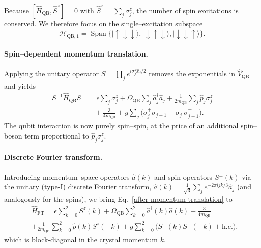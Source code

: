 \documentclass[reprint, aps, prx, amsmath, amssymb, longbibliography, superscriptaddress]{revtex4-2}
\begin{document}
Because $[ \hat H_{\text{QB}}, \hat S^z ] = 0$ with $\hat S^z = \sum_j
\sigma_j^z$, the number of spin excitations is conserved.  We therefore focus
on the single--excitation subspace
\begin{equation}
  \mathcal H_{\text{QB},1} = \operatorname{Span}\bigl\{ |
    \uparrow\downarrow\downarrow\rangle,
    |\downarrow\uparrow\downarrow\rangle,
    |\downarrow\downarrow\uparrow\rangle \bigr\}.
\end{equation}

\paragraph{Spin--dependent momentum translation.}
Applying the unitary operator
$S = \prod_j e^{ i \sigma_j^z \hat x_j / 2 }$ removes the exponentials in
$\hat V_{\text{QB}}$ and yields
\begin{equation}
\label{after-momentum-translation}
  \begin{aligned}
    S^{-1} \hat H_{\text{QB}} S &= \epsilon \sum_{j} \sigma_j^z
      + \Omega_{\text{QB}} \sum_j \hat a_j^{\dagger} \hat a_j
      + \frac{1}{2 m_{\text{QB}}} \sum_j \hat p_j \sigma_j^z
      \\
      &\quad + \frac{3}{4 m_{\text{QB}}}
      + g \sum_{j}
        \bigl( \sigma_j^{+} \sigma_{j+1}^{-} + \sigma_j^{-} \sigma_{j+1}^{+} \bigr).
  \end{aligned}
\end{equation}
The qubit interaction is now purely spin--spin, at the price of an additional
spin--boson term proportional to $\hat p_j \sigma_j^z$.

\paragraph{Discrete Fourier transform.}
Introducing momentum--space operators $\hat a(k)$ and spin operators $S^{\pm}(k)$
via the unitary (type-I) discrete Fourier transform, $\hat a(k)= \tfrac{1}{\sqrt{3}}\sum_{j}e^{-2\pi i jk/3}\hat a_j$ (and analogously for the spins), we
bring Eq.~\eqref{after-momentum-translation} to
\begin{equation}
\label{after-fourier}
  \begin{aligned}
    &\hat H_{\text{FT}} = \epsilon \sum_{k=0}^{2} S^{z}(k)
      + \Omega_{\text{QB}} \sum_{k=0}^{2} \hat a^{\dagger}(k) \hat a(k)
                         + \frac{3}{4 m_{\text{QB}}} \\
     &+\frac{1}{2 m_{\text{QB}}} \sum_{k=0}^{2} \hat p(k) S^{z}(-k)
            + g \sum_{k=0}^{2} \bigl( S^{+}(k) S^{-}(-k) + \text{h.c.} \bigr),
  \end{aligned}
\end{equation}
which is block-diagonal in the crystal momentum $k$.
\end{document}
